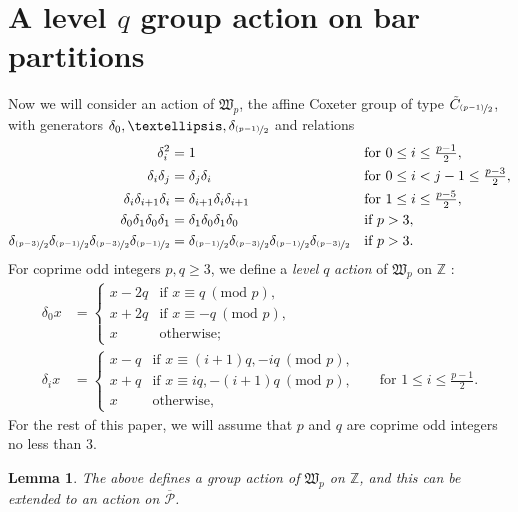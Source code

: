 \documentclass[10pt]{amsart}
\newtheorem{lemm}[prop]{Lemma}
\begin{document}
\section{A level $q$ group action on bar partitions}
 
Now we will consider an action of $\mathfrak{W}_p$, the affine Coxeter group of type $\tilde{C}_{\nicefrac{(p-1)}{2}}$, with generators $\delta_0, \dots, \delta_{\nicefrac{(p-1)}{2}}$ and relations 
\begin{align*}\delta_i^2&=1&&\text{for }0\leq{i}\leq\tfrac{p-1}{2},\\
\delta_i\delta_j&=\delta_j\delta_i&&\text{for }0\leq{i}<j-1\leq\tfrac{p-3}{2},\\
\delta_i\delta_{i+1}\delta_i&=\delta_{i+1}\delta_i\delta_{i+1}&&\text{for }1\leq{i}\leq\tfrac{p-5}{2},\\
\delta_0\delta_1\delta_0\delta_1&=\delta_1\delta_0\delta_1\delta_0&&\text{if }p>3,\\
\delta_{\nicefrac{(p-3)}{2}}\delta_{\nicefrac{(p-1)}{2}}\delta_{\nicefrac{(p-3)}{2}}\delta_{\nicefrac{(p-1)}{2}}&=\delta_{\nicefrac{(p-1)}{2}}\delta_{\nicefrac{(p-3)}{2}}\delta_{\nicefrac{(p-1)}{2}}\delta_{\nicefrac{(p-3)}{2}}&&\text{if }p>3.\end{align*}
For coprime odd integers $p,q\geq3$, we define a \textit{level} $q$ \textit{action} of $\mathfrak{W}_p$ on $\mathbb{Z}$ \cite{F3}: 
\begin{align*}\delta_0x&=\begin{cases}x-2q&\text{if }x\equiv q\:(\text{mod }p),\\
x+2q&\text{if }x\equiv-q\:(\text{mod }p),\\
x&\text{otherwise;}\end{cases}\\ 
\delta_ix&=\begin{cases}x-q&\text{if }x\equiv(i+1)q,-iq\:(\text{mod }p),\\
x+q&\text{if }x\equiv iq,-(i+1)q\:(\text{mod }p),\\
x&\text{otherwise,}\end{cases}&&\text{for }1\leq i\leq\tfrac{p-1}{2}.\end{align*}
For the rest of this paper, we will assume that $p$ and $q$ are coprime odd integers no less than 3. 
\begin{lemm}
The above defines a group action of $\mathfrak{W}_p$ on $\mathbb{Z}$, and this can be extended to an action on $\overline{\mathcal{P}}$.
\end{lemm}
\end{document}
